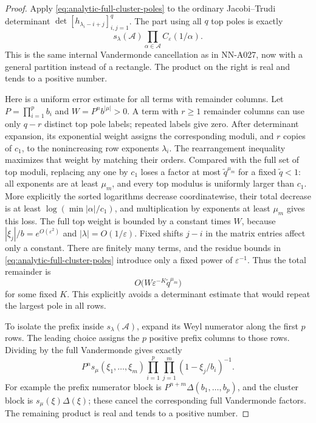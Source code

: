 \begin{proof}
Apply \eqref{eq:analytic-full-cluster-poles} to the ordinary
Jacobi--Trudi determinant $\det[h_{\lambda_i-i+j}]_{i,j=1}^q$.
The part using all $q$ top poles is exactly
\begin{equation}\label{eq:analytic-full-cluster-leading}
                  s_\lambda(\mathcal A)
                              \prod_{\alpha\in\mathcal A}C_\varepsilon(1/\alpha).
\end{equation}
This is the same internal Vandermonde cancellation as in NN-A027,
now with a general partition instead of a rectangle. The product on
the right is real and tends to a positive number.

Here is a uniform error estimate for all terms with remainder columns.
Let $P=\prod_{i=1}^p b_i$ and $W=P^n b^{|\mu|}>0$.
A term with $r\ge1$ remainder columns can use only $q-r$ distinct
top pole labels; repeated labels give zero. After determinant expansion,
its exponential weight assigns the corresponding moduli, and $r$ copies
of $c_1$, to the nonincreasing row exponents $\lambda_i$.
The rearrangement inequality maximizes that weight by matching their
orders. Compared with the full set of top moduli, replacing any one
by $c_1$ loses a factor at most
$\widetilde q^{\mu_m}$ for a fixed $\widetilde q<1$:
all exponents are at least $\mu_m$, and every top modulus is uniformly
larger than $c_1$. More explicitly the sorted logarithms decrease
coordinatewise, their total decrease is at least
$\log(\min|\alpha|/c_1)$, and multiplication by exponents at least
$\mu_m$ gives this loss. The full top weight is bounded by a constant
times $W$, because $|\xi_j|/b=e^{O(\varepsilon^2)}$ and
$|\lambda|=O(1/\varepsilon)$. Fixed shifts $j-i$ in the matrix entries
affect only a constant. There are finitely many terms, and the residue
bounds in \eqref{eq:analytic-full-cluster-poles} introduce only a fixed
power of $\varepsilon^{-1}$. Thus the total remainder is
\begin{equation}\label{eq:analytic-tail-exponential-error}
                  O\bigl(W\varepsilon^{-K}
                              \widetilde q^{\mu_m}\bigr)
\end{equation}
for some fixed $K$. This explicitly avoids a determinant estimate that
would repeat the largest pole in all rows.

To isolate the prefix inside $s_\lambda(\mathcal A)$, expand its Weyl
numerator along the first $p$ rows. The leading choice assigns the
$p$ positive prefix columns to those rows. Dividing by the full
Vandermonde gives exactly
\begin{equation}\label{eq:analytic-prefix-factorization}
 P^n s_\mu(\xi_1,\ldots,\xi_m)
            \prod_{i=1}^p\prod_{j=1}^m(1-\xi_j/b_i)^{-1}.
\end{equation}
For example the prefix numerator block is
$P^{n+m}\Delta(b_1,\ldots,b_p)$, and the cluster block is
$s_\mu(\xi)\Delta(\xi)$; these cancel the corresponding full
Vandermonde factors. The remaining product is real and tends to a
positive number.


\end{proof}
